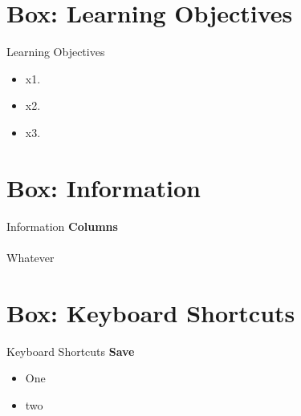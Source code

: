 \section{Box: Learning Objectives}
\begin{center}
	\begin{objbox}{Learning Objectives}
		\begin{itemize}
			\setlength{\itemsep}{0pt}
			\setlength{\parskip}{0pt}
			\setlength{\parsep}{0pt}
		
			\item x1.
			\item x2.
			\item x3.
		\end{itemize}
	\end{objbox}
\end{center}

\section{Box: Information}
\begin{center}
	\begin{infobox}{Information}
		\textbf{Columns}
		\\
		\\
		Whatever
	\end{infobox}
\end{center}

\section{Box: Keyboard Shortcuts}
\begin{center}
	\begin{shtcutbox}{Keyboard Shortcuts}
		\textbf{Save}
		\\
		\begin{itemize}
			\setlength{\itemsep}{0pt}
			\setlength{\parskip}{0pt}
			\setlength{\parsep}{0pt}
			
			\item One
			\item two
			
		\end{itemize}
	\end{shtcutbox}
\end{center}

